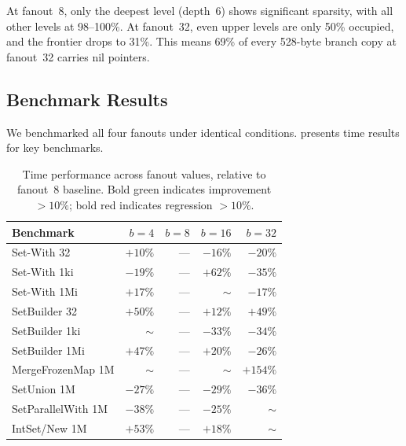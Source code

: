 \documentclass[11pt,twocolumn]{article}
\newcommand{\improve}[1]{\textcolor{positive}{\textbf{#1}}}
\newcommand{\regress}[1]{\textcolor{negative}{\textbf{#1}}}
\begin{document}
At fanout~8, only the deepest level (depth~6) shows significant sparsity,
with all other levels at 98--100\%.
At fanout~32, even upper levels are only 50\% occupied, and the frontier
drops to 31\%.
This means 69\% of every 528-byte branch copy at fanout~32 carries nil
pointers.

\subsection{Benchmark Results}

We benchmarked all four fanouts under identical conditions.
 presents time results for key benchmarks.

\begin{table}[t]
\centering
\caption{Time performance across fanout values, relative to fanout~8
  baseline. Bold green indicates improvement $> 10\%$; bold red indicates
  regression $> 10\%$.}
\label{tab:fanout-time}
\begin{tabular}{@{}lrrrr@{}}
\toprule
Benchmark & $b = 4$ & $b = 8$ & $b = 16$ & $b = 32$ \\
\midrule
Set-With 32         & $+10\%$          & ---      & \improve{$-16\%$}  & \improve{$-20\%$} \\
Set-With 1ki        & \improve{$-19\%$}& ---      & \regress{$+62\%$}  & \improve{$-35\%$} \\
Set-With 1Mi        & \regress{$+17\%$}& ---      & $\sim$             & \improve{$-17\%$} \\
\midrule
SetBuilder 32       & \regress{$+50\%$}& ---      & \regress{$+12\%$}  & \regress{$+49\%$} \\
SetBuilder 1ki      & $\sim$           & ---      & \improve{$-33\%$}  & \improve{$-34\%$} \\
SetBuilder 1Mi      & \regress{$+47\%$}& ---      & \regress{$+20\%$}  & \improve{$-26\%$} \\
\midrule
MergeFrozenMap 1M   & $\sim$           & ---      & $\sim$             & \regress{$+154\%$} \\
SetUnion 1M         & \improve{$-27\%$}& ---      & \improve{$-29\%$}  & \improve{$-36\%$} \\
SetParallelWith 1M  & \improve{$-38\%$}& ---      & \improve{$-25\%$}  & $\sim$ \\
IntSet/New 1M       & \regress{$+53\%$}& ---      & \regress{$+18\%$}  & $\sim$ \\
\bottomrule
\end{tabular}
\end{table}
\end{document}

